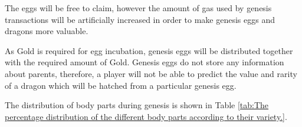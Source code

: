 \documentclass[12pt]{article}
\begin{document}
The eggs will be free to claim, however the amount of gas used by genesis transactions will be artificially increased in order to make genesis eggs and dragons more valuable.\par

As Gold is required for egg incubation, genesis eggs will be distributed together with the required amount of Gold. Genesis eggs do not store any information about parents, therefore, a player will not be able to predict the value and rarity of a dragon which will be hatched from a particular genesis egg.\par

The distribution of body parts during genesis is shown in  Table \ref{tab:The percentage distribution of the different body parts according to their variety.}.\par




\end{document}
